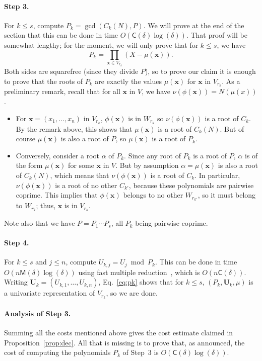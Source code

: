 \documentclass[12pt]{article}
\def\CC {\ensuremath{\mathsf{C}}}
\def\M {\ensuremath{\mathsf{M}}}
\def\Uu {\ensuremath{\mathbf{U}}}
\def\x {\ensuremath{\mathbf{x}}}
\begin{document}
\paragraph{Step 3.} For $k \le s$, compute $P_k=\gcd(C_k(N),P)$.  We
will prove at the end of the section that this can be done in time
$O(\CC(\delta)\log(\delta))$. That proof will be somewhat lengthy; for
the moment, we will only prove that for $k\le s$, we have
\begin{equation}\label{eq:pk}
  P_k = \prod_{\x \in V_{r_k}} (X-\mu(\x)).
\end{equation}
Both sides are squarefree (since they divide $P$), so to prove our
claim it is enough to prove that the roots of $P_k$ are exactly the
values $\mu(\x)$ for $\x$ in $V_{r_k}$. As a preliminary remark,
recall that for all $\x$ in $V$, we have $\nu(\phi(\x))=N(\mu(x))$.
\begin{itemize}
\item For $\x=(x_1,\dots,x_n)$ in $V_{r_k}$, $\phi(\x)$ is in
  $W_{r_k}$ so $\nu(\phi(\x))$ is a root of $C_k$. By the remark
  above, this shows that $\mu(\x)$ is a root of $C_k(N)$. But of
  course $\mu(\x)$ is also a root of $P$, so $\mu(\x)$ is a root of
  $P_k$.
\item Conversely, consider a root $\alpha$ of $P_k$. Since any root of
  $P_k$ is a root of $P$, $\alpha$ is of the form $\mu(\x)$ for some
  $\x$ in $V$. But by assumption $\alpha=\mu(\x)$ is also a root of
  $C_k(N)$, which means that $\nu(\phi(\x))$ is a root of $C_k$.  In
  particular, $\nu(\phi(\x))$ is a root of no other $C_{k'}$, because
  these polynomials are pairwise coprime. This implies that $\phi(\x)$
  belongs to no other $W_{r_{k'}}$, so it must belong to $W_{r_k}$; thus,
  $\x$ is in $V_{r_k}$.
\end{itemize}
Note also that we have $P=P_1 \cdots P_s$, all $P_k$ being pairwise coprime.

\paragraph{Step 4.} For $k \le s$ and $j \le n$, compute $U_{k,j} =
U_j \bmod P_k$. This can be done in time $O(n \M(\delta)
\log(\delta))$ using fast multiple
reduction~\cite[Chapter~10]{GaGe03}, which is $O(n\CC(\delta))$.
Writing $\Uu_k=(U_{k,1},\dots,U_{k,n})$, Eq.~\eqref{eq:pk} shows that
for $k \le s$, $(P_k,\Uu_k,\mu)$ is a univariate representation of
$V_{r_k}$, so we are done.

\paragraph{Analysis of Step 3.} Summing all the costs mentioned above
gives the cost estimate claimed in Proposition~\ref{prop:dec}.  All
that is missing is to prove that, as announced, the cost of computing
the polynomials $P_k$ of Step~3 is $O(\CC(\delta)\log(\delta))$.
\end{document}
